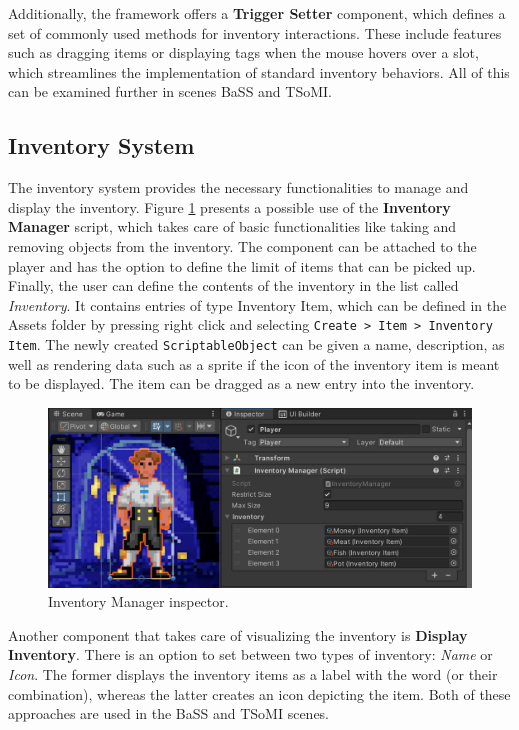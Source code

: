 Additionally, the framework offers a \textbf{Trigger Setter} component, which defines a set of commonly used methods for inventory interactions. These include features such as dragging items or displaying tags when the mouse hovers over a slot, which streamlines the implementation of standard inventory behaviors. All of this can be examined further in scenes BaSS and TSoMI.

\subsection{Inventory System}
\label{UD-IS}
The inventory system provides the necessary functionalities to manage and display the inventory. Figure \ref{fig:Manual-Inventory} presents a possible use of the \textbf{Inventory Manager} script, which takes care of basic functionalities like taking and removing objects from the inventory. The component can be attached to the player and has the option to define the limit of items that can be picked up. Finally, the user can define the contents of the inventory in the list called \textit{Inventory}. It contains entries of type Inventory Item, which can be defined in the Assets folder by pressing right click and selecting \verb|Create > Item > Inventory Item|. The newly created \verb|ScriptableObject| can be given a name, description, as well as rendering data such as a sprite if the icon of the inventory item is meant to be displayed. The item can be dragged as a new entry into the inventory.
\begin{figure}[H]
\centering
\includegraphics[width=.8\linewidth]{img/User doc/inventory.png}
\caption{Inventory Manager inspector.}
\label{fig:Manual-Inventory}
\end{figure}

Another component that takes care of visualizing the inventory is \textbf{Display Inventory}. There is an option to set between two types of inventory: \textit{Name} or \textit{Icon}. The former displays the inventory items as a label with the word (or their combination), whereas the latter creates an icon depicting the item. Both of these approaches are used in the BaSS and TSoMI scenes.

